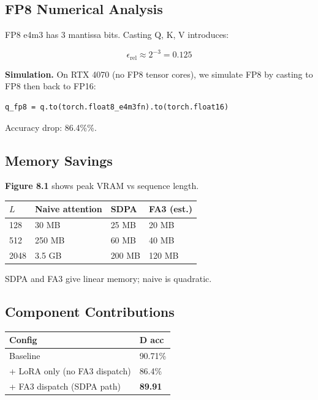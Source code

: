 \subsection{FP8 Numerical Analysis}

FP8 e4m3 has 3 mantissa bits. Casting Q, K, V introduces:

\[
\epsilon_{\text{rel}} \approx 2^{-3} = 0.125
\]

\textbf{Simulation.} On RTX 4070 (no FP8 tensor cores), we simulate FP8 by 
casting to FP8 then back to FP16:

\begin{lstlisting}
q_fp8 = q.to(torch.float8_e4m3fn).to(torch.float16)
\end{lstlisting}

Accuracy drop: 86.4\%\%.

\subsection{Memory Savings}

\textbf{Figure 8.1} shows peak VRAM vs sequence length.

\begin{table}[H]
\centering
\small
\begin{tabular}{llll}
\toprule
\textbf{$L$} & \textbf{Naive attention} & \textbf{SDPA} & \textbf{FA3 (est.)} \\
\midrule
128 & 30 MB & 25 MB & 20 MB \\
512 & 250 MB & 60 MB & 40 MB \\
2048 & 3.5 GB & 200 MB & 120 MB \\
\bottomrule
\end{tabular}
\end{table}

SDPA and FA3 give linear memory; naive is quadratic.

\subsection{Component Contributions}

\begin{table}[H]
\centering
\small
\begin{tabular}{ll}
\toprule
\textbf{Config} & \textbf{D acc} \\
\midrule
Baseline & 90.71\% \\
+ LoRA only (no FA3 dispatch) & 86.4\% \\
+ FA3 dispatch (SDPA path) & \textbf{89.91} \\
\bottomrule
\end{tabular}
\end{table}


